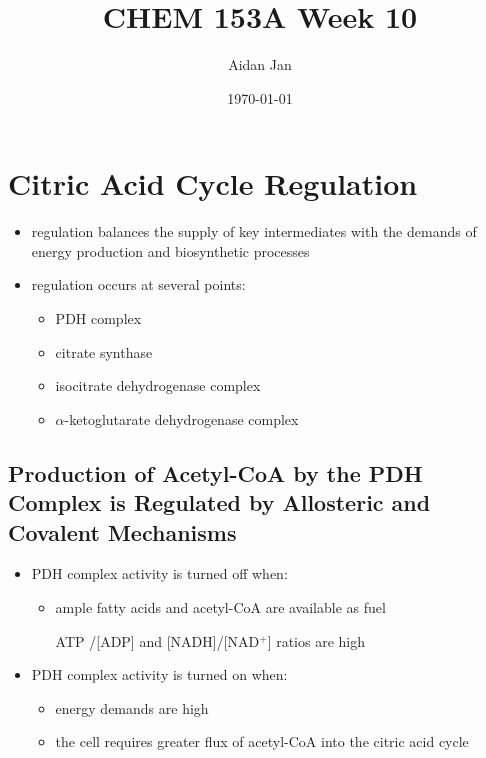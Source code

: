 \documentclass[10pt]{article}
\title{CHEM 153A Week 10}
\author{Aidan Jan}
\date{\today}
\newcommand{\pc}{$^+$}
\begin{document}
\maketitle
\section*{Citric Acid Cycle Regulation}
\begin{itemize}
	\item regulation balances the supply of key intermediates with the demands of energy production and biosynthetic processes
	\item regulation occurs at several points:
	\begin{itemize}
        \item PDH complex
        \item citrate synthase
        \item isocitrate dehydrogenase complex
        \item $\alpha$-ketoglutarate dehydrogenase complex
    \end{itemize}
\end{itemize}

\subsection*{Production of Acetyl-CoA by the PDH Complex is Regulated by Allosteric and Covalent Mechanisms}
\begin{itemize}
	\item PDH complex activity is turned off when:
	\begin{itemize}
        \item ample fatty acids and acetyl-CoA are available as fuel
        \item [ATP]/[ADP] and [NADH]/[NAD\pc] ratios are high
    \end{itemize}
	\item PDH complex activity is turned on when:
	\begin{itemize}
        \item energy demands are high
        \item the cell requires greater flux of acetyl-CoA into the citric acid cycle
    \end{itemize}
\end{itemize}
\end{document}
